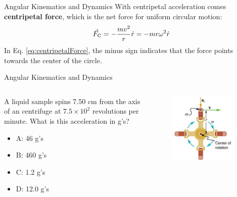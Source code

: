 \documentclass{beamer}
\begin{document}
\begin{frame}{Angular Kinematics and Dynamics}
With centripetal acceleration comes \textbf{\alert{centripetal force}}, which is the net force for uniform circular motion:
\begin{equation}
\vec{F}_{\rm C} = - \frac{mv^2}{r}\hat{r} = -m r \omega^2 \hat{r}
\label{eq:centripetalForce}
\end{equation}
In Eq. \ref{eq:centripetalForce}, the minus sign indicates that the force points towards the center of the circle.
\end{frame}

\begin{frame}{Angular Kinematics and Dynamics}
\begin{columns}[T]
\begin{column}{0.45\textwidth}
\small
A liquid sample spins 7.50 cm from the axis of an centrifuge at $7.5 \times 10^2$ revolutions per minute.  What is this acceleration in g's?
\begin{itemize}
\item A: 46 g's
\item B: 460 g's
\item C: 1.2 g's
\item D: 12.0 g's
\end{itemize}
\end{column}
\begin{column}{0.55\textwidth}
\begin{figure}
\centering
\includegraphics[width=0.9\textwidth]{figures/centrifuge.png}
\end{figure}
\end{column}
\end{columns}
\end{frame}
\end{document}
